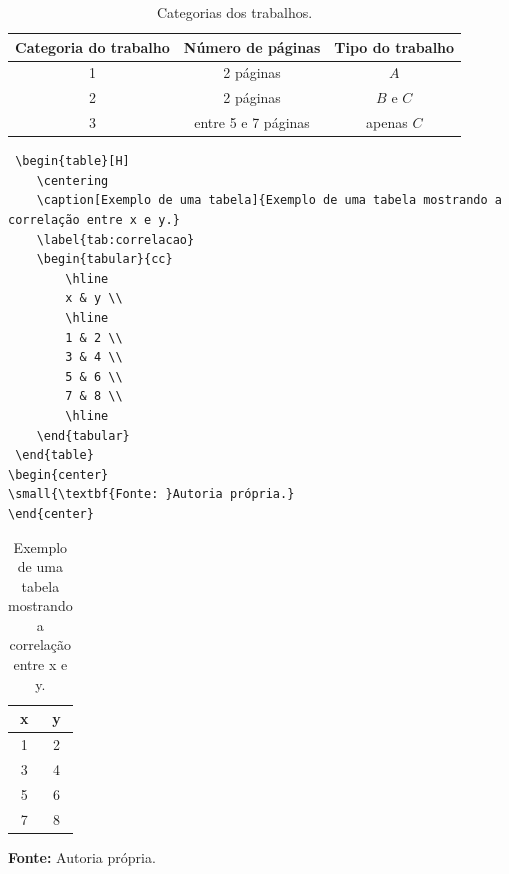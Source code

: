 \documentclass[a4,12pt]{modelo}
\begin{document}
   
\begin{table}[H]
 \caption{ {\small Categorias dos trabalhos.}}
 \begin{center}
 \begin{tabular}{|c|c|c|}
  \hline  
   Categoria do trabalho  & Número de páginas & Tipo do trabalho\\
  \hline
   1          & 2 páginas & $A$   \\
  \hline
   2          & 2 páginas & $B$ e $C$ \\
  \hline
   3          & entre 5 e 7 páginas & apenas $C$ \\
  \hline
 \end{tabular} 
 \label{tabela01}
 \end{center} 
\end{table} 


\begin{verbatim}
 \begin{table}[H]
 	\centering
 	\caption[Exemplo de uma tabela]{Exemplo de uma tabela mostrando a correlação entre x e y.}
 	\label{tab:correlacao}
 	\begin{tabular}{cc}
 		\hline
 		x & y \\
 		\hline
 		1 & 2 \\
 		3 & 4 \\
 		5 & 6 \\
 		7 & 8 \\
 		\hline
 	\end{tabular}
 \end{table}
\begin{center}
\small{\textbf{Fonte: }Autoria própria.}
\end{center}   
\end{verbatim}    
 \begin{table}[H]
	\centering
	\caption[Exemplo de uma tabela]{Exemplo de uma tabela mostrando a correlação entre x e y.}
	\label{tab:correlacao}
	\begin{tabular}{cc}
		\hline
		x & y \\
		\hline
		1 & 2 \\
		3 & 4 \\
		5 & 6 \\
		7 & 8 \\
		\hline
	\end{tabular}
\end{table}
\begin{center}
	\small{\textbf{Fonte: }Autoria própria.}
\end{center}
    
\end{document}
